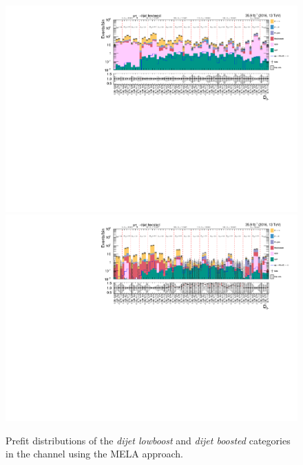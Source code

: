     \begin{figure}[h!]
        \centering        
        \includegraphics[width=\textwidth]{Figures/statana/Postfit_JEC_mela3D/prefit_htt_mt_3_13TeV.pdf}\\
        \includegraphics[width=\textwidth]{Figures/statana/Postfit_JEC_mela3D/prefit_htt_mt_4_13TeV.pdf}
    \caption{Prefit distributions of the \textit{dijet lowboost} and \textit{dijet boosted} categories in the \mutau{} channel  using the MELA approach.}
\end{figure}
\clearpage
